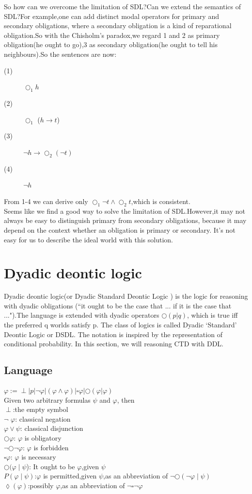 \documentclass{article}
\begin{document}
So how can we overcome the limitation of SDL?Can we extend the semantics of SDL?For example,one can add distinct modal operators for primary and secondary obligations, where a secondary obligation is a kind of reparational obligation.So with the Chisholm’s paradox,we regard 1 and 2 as primary obligation(he ought to go),3 as secondary obligation(he ought to tell his neighbours).So the sentences are now:
\begin{description}
\item[(1)] $\bigcirc_{1} h$
\item[(2)]$\bigcirc_{1}$ ($h \to t $)
\item[(3)]$\neg h \to \bigcirc_ {2} (\neg t)$
\item[(4)]$\neg h$
\end{description}
From 1-4 we can derive only $\bigcirc_{1} \neg t \wedge \bigcirc_{2} t$,which is consistent.\\
Seems like we find a good way to solve the limitation of SDL.However,it may not always be easy to distinguish primary from secondary obligations, because it may depend on the context whether an obligation is primary or secondary. It's not easy for us to describe the ideal world with this solution. 
\section{Dyadic deontic logic}
Dyadic deontic logic(or Dyadic Standard Deontic Logic ) is the logic for reasoning with dyadic obligations (“it ought to be the case that ... if it is the case that ...").The language is extended with dyadic operators 
 $\bigcirc(p|q)$, which is true iff the preferred q worlds satisfy p. The class of logics is called Dyadic ‘Standard’ Deontic Logic or DSDL. The notation is inspired by the representation of conditional probability.
In this section, we will reasoning CTD with DDL.
\subsection{Language}
$\varphi := \perp | p | \neg \varphi |(\varphi \wedge \varphi)|\square \varphi |\bigcirc(\varphi|\varphi)$\\
Given two arbitrary formulas $\psi$  and $\varphi$, then\\
$\perp$:the empty symbol\\
$\neg$ $\varphi$: classical negation\\
$\varphi \vee  \psi $: classical disjunction\\
$\bigcirc \varphi $: $\varphi$ is obligatory\\
$ \neg \bigcirc\neg\varphi$: $ \varphi$ is forbidden\\
$ \square\varphi$: $\varphi$ is necessary\\
$\bigcirc(\varphi\mid\psi$): It ought to be $\varphi$,given $\psi$\\
$P(\varphi\mid\psi) $:$\varphi$ is permitted,given $\psi$,as an abbreviation of $\neg\bigcirc(\neg\varphi\mid\psi)$\\
$\lozenge(\varphi)$:possibly $\varphi$,as an abbreviation of $\neg\square\neg\varphi$\\
\end{document}
